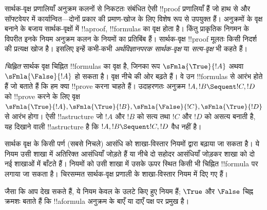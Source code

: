 \documentclass[../../../include/open-logic-section]{subfiles}
\begin{document}


सार्थक-वृक्ष प्रणालियाँ अनुक्रम कलनों से निकटतः संबंधित ऐसी !!{proof}
प्रणालियाँ हैं जो हाथ से और सॉफ्टवेयर में कार्यान्वित—दोनों प्रकार की
प्रमाण-खोज के लिए विशेष रूप से उपयुक्त हैं। अनुक्रमों के वृक्ष बनाने के बजाय
सार्थक-वृक्षों में !!a{proof}, !!{formula}s का वृक्ष होता है। किंतु प्राकृतिक
निगमन के विपरीत इनके नियम अनुक्रम कलन के नियमों का प्रतिबिंब हैं। सार्थक-वृक्ष
!!{proof} मूलतः किसी निदर्श की प्रत्यक्ष खोज है। इसलिए इन्हें कभी-कभी
\emph{अर्थविज्ञानपरक सार्थक-वृक्ष} या \emph{सत्य-वृक्ष} भी कहते हैं।

\emph{चिह्नित} सार्थक वृक्ष चिह्नित !!{formula}s का वृक्ष है, जिनका रूप
$\sFmla{\True}{!A}$ अथवा $\sFmla{\False}{!A}$ हो सकता है। वृक्ष नीचे की ओर
बढ़ते हैं। वे उन !!{formula}s से आरंभ होते हैं जो बताते हैं कि हम क्या
!!{prove} करना चाहते हैं। उदाहरणतः अनुक्रम $!A, !B \Sequent !C, !D$ को
!!{prove} करने के लिए वृक्ष $\sFmla{\True}{!A}, \sFmla{\True}{!B},
\sFmla{\False}{!C}, \sFmla{\True}{!D}$ से आरंभ होगा। ऐसी !!a{structure} जो
$!A$ और $!B$ को सत्य तथा $!C$ और $!D$ को असत्य बनाती है, यह दिखाने वाली
!!a{structure} है कि $!A, !B \Sequent !C, !D$ वैध नहीं है।

सार्थक वृक्ष के किसी पर्ण (सबसे निचले) आसंधि को शाखा-विस्तार नियमों द्वारा
बढ़ाया जा सकता है। ये नियम उसी शाखा में अतिरिक्त आसंधियाँ जोड़ते हैं या नीचे
दो सहोदर आसंधियाँ जोड़कर शाखा को दो नई शाखाओं में बाँटते हैं। नियमों को उसी
शाखा में उसके ऊपर स्थित किसी भी चिह्नित !!{formula} पर लगाया जा सकता है।
चिरसम्मत सार्थक-वृक्ष प्रणाली  के शाखा-विस्तार नियम
 में दिए गए हैं।



जैसा कि आप देख सकते हैं, ये नियम केवल  के उलटे किए हुए नियम हैं;
$\True$ और $\False$ चिह्न क्रमशः बताते हैं कि !!a{formula} अनुक्रम के बाएँ या
दाएँ पक्ष पर प्रमुख है।
\end{document}
